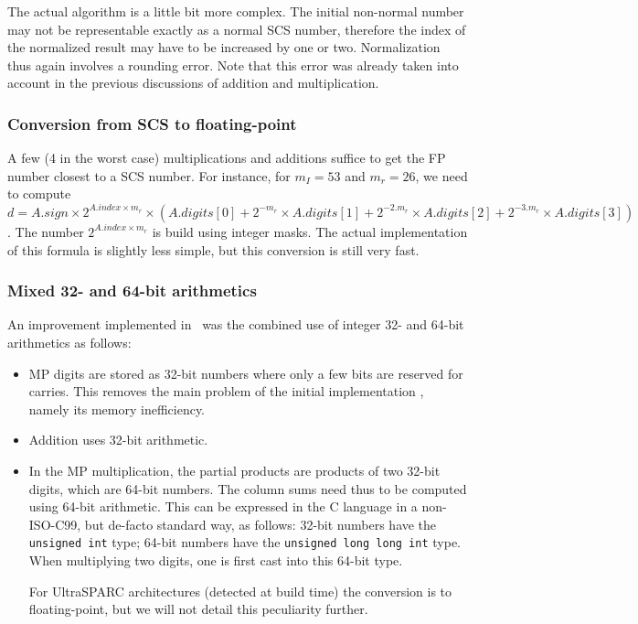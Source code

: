 The actual algorithm is a little bit more complex. The initial
non-normal number may not be representable exactly as a normal SCS
number, therefore the index of the normalized result may have to be
increased by one or two.  Normalization thus again involves a rounding
error. Note that this error was already taken into account in the previous
discussions of addition and multiplication.




\subsubsection{Conversion from SCS to floating-point}

A few (4 in the worst case) multiplications and additions suffice to
get the FP number closest to a SCS number.  For instance, for $m_I=53$
and $m_r=26$, we need to compute $d = A.sign \times 2^{A.index \times
  m_r} \times ( A.digits[0]+ 2^{-m_r} \times A.digits[1]+ 2^{-2.m_r}
\times A.digits[2]+ 2^{-3.m_r} \times A.digits[3])$. The number
$2^{A.index \times m_r}$ is build using integer masks. The actual
implementation of this formula is slightly less simple, but this
conversion is still very fast.


\subsubsection{Mixed 32- and 64-bit arithmetics}

An improvement implemented in \scslib\ was the combined use of integer 32- and 64-bit
arithmetics as follows: 

\begin{itemize}
\item MP digits are stored as 32-bit numbers where only a few bits are
  reserved for carries. This removes the main problem of the initial
implementation \cite{DefDin2002}, namely its memory inefficiency.

\item Addition uses 32-bit arithmetic. 

\item In the MP multiplication, the partial products are products of
  two 32-bit digits, which are 64-bit numbers. The column sums need
  thus to be computed using 64-bit arithmetic. This can be expressed
  in the C language in a non-ISO-C99, but de-facto standard way, as
  follows: 32-bit numbers have the \texttt{unsigned int} type; 64-bit
  numbers have the \texttt{unsigned long long int} type. When
  multiplying two digits, one is first cast into this 64-bit type.
  
  For UltraSPARC architectures (detected at build time) the
  conversion is to floating-point, but we will not detail this
  peculiarity further.
\end{itemize}


